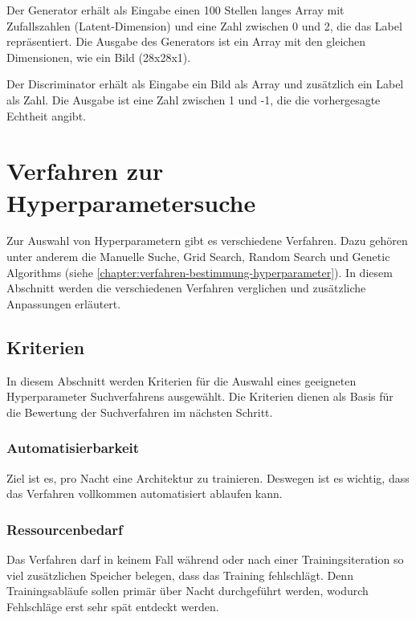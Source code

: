 Der Generator erhält als Eingabe einen 100 Stellen langes Array mit Zufallszahlen (Latent-Dimension) und eine Zahl zwischen 0 und 2, die das Label repräsentiert.
Die Ausgabe des Generators ist ein Array mit den gleichen Dimensionen, wie ein Bild (28x28x1).
\newline

Der Discriminator erhält als Eingabe ein Bild als Array und zusätzlich ein Label als Zahl.
Die Ausgabe ist eine Zahl zwischen 1 und -1, die die vorhergesagte Echtheit angibt.

\section{Verfahren zur Hyperparametersuche}
Zur Auswahl von Hyperparametern gibt es verschiedene Verfahren.
Dazu gehören unter anderem die Manuelle Suche, Grid Search, Random Search und Genetic Algorithms (siehe \cref{chapter:verfahren-bestimmung-hyperparameter}).
In diesem Abschnitt werden die verschiedenen Verfahren verglichen und zusätzliche Anpassungen erläutert.

\subsection{Kriterien}
In diesem Abschnitt werden Kriterien für die Auswahl eines geeigneten Hyperparameter Suchverfahrens ausgewählt.
Die Kriterien dienen als Basis für die Bewertung der Suchverfahren im nächsten Schritt.

\subsubsection{Automatisierbarkeit}
Ziel ist es, pro Nacht eine Architektur zu trainieren.
Deswegen ist es wichtig, dass das Verfahren vollkommen automatisiert ablaufen kann.

\subsubsection{Ressourcenbedarf}
Das Verfahren darf in keinem Fall während oder nach einer Trainingsiteration so viel zusätzlichen Speicher belegen, dass das Training fehlschlägt.
Denn Trainingsabläufe sollen primär über Nacht durchgeführt werden, wodurch Fehlschläge erst sehr spät entdeckt werden.

